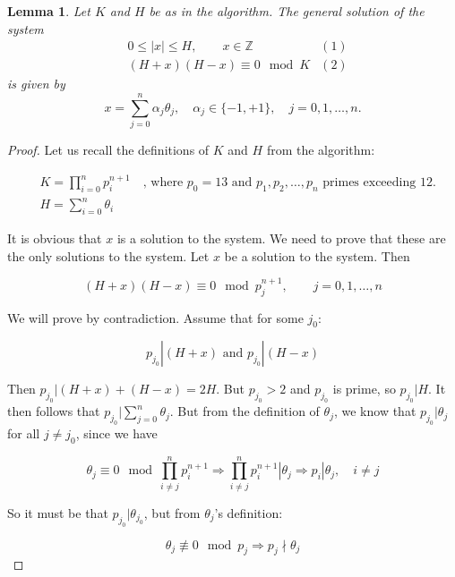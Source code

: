 \documentclass{amsart}
\theoremstyle{plain}
\newtheorem{lemma}{Lemma}
\renewcommand{\implies}{\Rightarrow}
\begin{document}
\begin{lemma}\label{lemma-1}
  Let $K$ and $H$ be as in the algorithm. The general solution of the system
  \begin{align*}
    &0\leq|x|\leq H, \qquad x\in\mathbb{Z} \quad &(1)\\
    &(H+x)(H-x)\equiv 0\mod K &(2)
  \end{align*}
  is given by
  \begin{equation*}
    x=\sum_{j=0}^n\alpha_j\theta_j, \quad\alpha_j\in\{-1,+1\},\quad j=0,1,\ldots,n.
  \end{equation*}
\end{lemma}
\begin{proof}
  Let us recall the definitions of $K$ and $H$ from the algorithm:

  \begin{align*}
    &K=\prod_{i=0}^n p_i^{n+1} \quad\text{, where $p_0=13$ and $p_1,p_2,\ldots,p_n$ primes
    exceeding 12.}\\
    &H=\sum_{i=0}^n\theta_i
  \end{align*}

  It is obvious that $x$ is a solution to the system. We need to prove that these are the only
  solutions to the system. Let $x$ be a solution to the system. Then

  \begin{equation*}
    (H+x)(H-x)\equiv 0\mod p_j^{n+1}, \qquad j=0,1,\ldots,n
  \end{equation*}

  We will prove by contradiction. Assume that for some $j_0$:

  \begin{equation*}
    p_{j_0}|(H+x)\text{ and }p_{j_0}|(H-x)
  \end{equation*}

  Then $p_{j_0}|(H+x)+(H-x)=2H$. But $p_{j_0}>2$ and $p_{j_0}$ is prime, so $p_{j_0}|H$. It then
  follows that $p_{j_0}|\sum_{j=0}^n\theta_j$. But from the definition of $\theta_j$, we know that
  $p_{j_0}|\theta_j$ for all $j\neq j_0$, since we have

  \begin{equation*}
    \theta_j\equiv 0\mod\prod_{i\neq j}^n p_i^{n+1}\implies\prod_{i\neq j}^n p_i^{n+1}|\theta_j
    \implies p_i|\theta_j, \quad i\neq j
  \end{equation*}

  So it must be that $p_{j_0}|\theta_{j_0}$, but from $\theta_j$'s definition:

  \begin{equation*}
    \theta_j\not\equiv 0\mod p_j\implies p_j\nmid\theta_j
  \end{equation*}


\end{proof}
\end{document}
